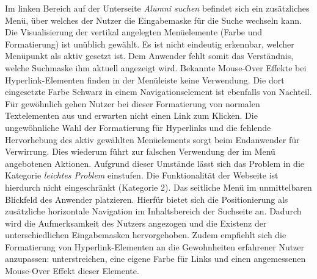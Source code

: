 {Im linken Bereich auf der Unterseite \emph{Alumni suchen} befindet sich ein zusätzliches Menü, über welches der Nutzer die Eingabemaske für die Suche wechseln kann. Die Visualisierung der vertikal angelegten Menüelemente (Farbe und Formatierung) ist unüblich gewählt. Es ist nicht eindeutig erkennbar, welcher Menüpunkt als aktiv gesetzt ist. Dem Anwender fehlt somit das Verständnis, welche Suchmaske ihm aktuell angezeigt wird. Bekannte Mouse-Over Effekte bei Hyperlink-Elementen finden in der Menüleiste keine Verwendung. Die dort eingesetzte Farbe Schwarz in einem Navigationselement ist ebenfalls von Nachteil. Für gewöhnlich gehen Nutzer bei dieser Formatierung von normalen Textelementen aus und erwarten nicht einen Link zum Klicken.
}
{
	Die ungewöhnliche Wahl der Formatierung für Hyperlinks und die fehlende Hervorhebung des aktiv gewählten Menüelements sorgt beim Endanwender für Verwirrung. Dies wiederum führt zur falschen Verwendung der im Menü angebotenen Aktionen. Aufgrund dieser Umstände lässt sich das Problem in die Kategorie \emph{leichtes Problem} einstufen. Die Funktionalität der Webseite ist hierdurch nicht eingeschränkt (Kategorie 2).
}
{
	Das seitliche Menü im unmittelbaren Blickfeld des Anwender platzieren. Hierfür bietet sich die Positionierung als zusätzliche horizontale Navigation im Inhaltsbereich der Suchseite an. Dadurch wird die Aufmerksamkeit des Nutzers angezogen und die Existenz der unterschiedlichen Eingabemasken hervorgehoben. Zudem empfiehlt sich die Formatierung von Hyperlink-Elementen an die Gewohnheiten erfahrener Nutzer anzupassen: unterstreichen, eine eigene Farbe für Links und einen angemessenen Mouse-Over Effekt dieser Elemente.
}


